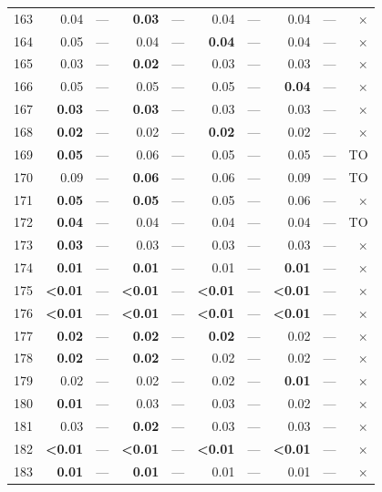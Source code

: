 \begin{longtable}{lr@{\hskip 4pt}l@{\hskip 12pt}r@{\hskip 4pt}l@{\hskip 12pt}r@{\hskip 4pt}l@{\hskip 12pt}r@{\hskip 4pt}l@{\hskip 12pt}r}
163 & 0.04 & --- & \textbf{0.03} & --- & 0.04 & --- & 0.04 & --- & $\times$ \\
164 & 0.05 & --- & 0.04 & --- & \textbf{0.04} & --- & 0.04 & --- & $\times$ \\
165 & 0.03 & --- & \textbf{0.02} & --- & 0.03 & --- & 0.03 & --- & $\times$ \\
166 & 0.05 & --- & 0.05 & --- & 0.05 & --- & \textbf{0.04} & --- & $\times$ \\
167 & \textbf{0.03} & --- & \textbf{0.03} & --- & 0.03 & --- & 0.03 & --- & $\times$ \\
168 & \textbf{0.02} & --- & 0.02 & --- & \textbf{0.02} & --- & 0.02 & --- & $\times$ \\
169 & \textbf{0.05} & --- & 0.06 & --- & 0.05 & --- & 0.05 & --- & TO \\
170 & 0.09 & --- & \textbf{0.06} & --- & 0.06 & --- & 0.09 & --- & TO \\
171 & \textbf{0.05} & --- & \textbf{0.05} & --- & 0.05 & --- & 0.06 & --- & $\times$ \\
172 & \textbf{0.04} & --- & 0.04 & --- & 0.04 & --- & 0.04 & --- & TO \\
173 & \textbf{0.03} & --- & 0.03 & --- & 0.03 & --- & 0.03 & --- & $\times$ \\
174 & \textbf{0.01} & --- & \textbf{0.01} & --- & 0.01 & --- & \textbf{0.01} & --- & $\times$ \\
175 & \textbf{<0.01} & --- & \textbf{<0.01} & --- & \textbf{<0.01} & --- & \textbf{<0.01} & --- & $\times$ \\
176 & \textbf{<0.01} & --- & \textbf{<0.01} & --- & \textbf{<0.01} & --- & \textbf{<0.01} & --- & $\times$ \\
177 & \textbf{0.02} & --- & \textbf{0.02} & --- & \textbf{0.02} & --- & 0.02 & --- & $\times$ \\
178 & \textbf{0.02} & --- & \textbf{0.02} & --- & 0.02 & --- & 0.02 & --- & $\times$ \\
179 & 0.02 & --- & 0.02 & --- & 0.02 & --- & \textbf{0.01} & --- & $\times$ \\
180 & \textbf{0.01} & --- & 0.03 & --- & 0.03 & --- & 0.02 & --- & $\times$ \\
181 & 0.03 & --- & \textbf{0.02} & --- & 0.03 & --- & 0.03 & --- & $\times$ \\
182 & \textbf{<0.01} & --- & \textbf{<0.01} & --- & \textbf{<0.01} & --- & \textbf{<0.01} & --- & $\times$ \\
183 & \textbf{0.01} & --- & \textbf{0.01} & --- & 0.01 & --- & 0.01 & --- & $\times$ \\

\end{longtable}
